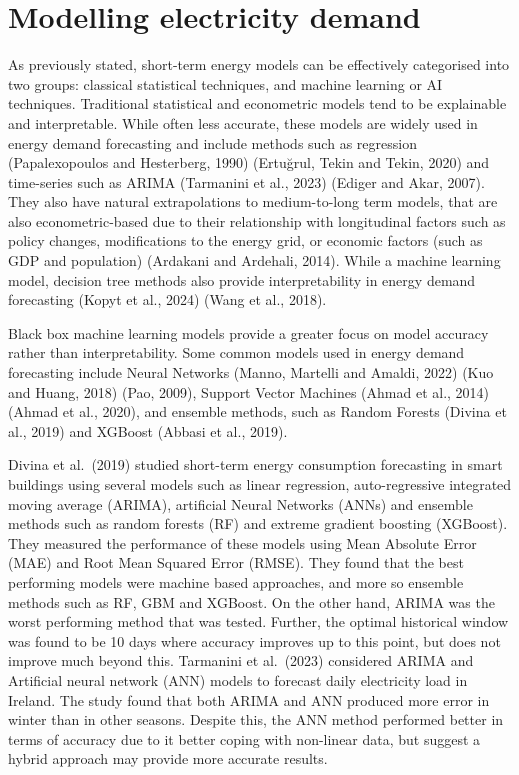 \documentclass[mstat,12pt]{unswthesis}
\begin{document}
\section{Modelling electricity demand}\label{modelling-electricity-demand}

As previously stated, short-term energy models can be effectively categorised into two groups: classical statistical techniques, and machine learning or AI techniques. Traditional statistical and econometric models tend to be explainable and interpretable. While often less accurate, these models are widely used in energy demand forecasting and include methods such as regression (Papalexopoulos and Hesterberg, 1990) (Ertuğrul, Tekin and Tekin, 2020) and time-series such as ARIMA (Tarmanini et al., 2023) (Ediger and Akar, 2007). They also have natural extrapolations to medium-to-long term models, that are also econometric-based due to their relationship with longitudinal factors such as policy changes, modifications to the energy grid, or economic factors (such as GDP and population) (Ardakani and Ardehali, 2014). While a machine learning model, decision tree methods also provide interpretability in energy demand forecasting (Kopyt et al., 2024) (Wang et al., 2018).

\bigskip

Black box machine learning models provide a greater focus on model accuracy rather than interpretability. Some common models used in energy demand forecasting include Neural Networks (Manno, Martelli and Amaldi, 2022) (Kuo and Huang, 2018) (Pao, 2009), Support Vector Machines (Ahmad et al., 2014) (Ahmad et al., 2020), and ensemble methods, such as Random Forests (Divina et al., 2019) and XGBoost (Abbasi et al., 2019).

\bigskip

Divina et al.~(2019) studied short-term energy consumption forecasting in smart buildings using several models such as linear regression, auto-regressive integrated moving average (ARIMA), artificial Neural Networks (ANNs) and ensemble methods such as random forests (RF) and extreme gradient boosting (XGBoost). They measured the performance of these models using Mean Absolute Error (MAE) and Root Mean Squared Error (RMSE). They found that the best performing models were machine based approaches, and more so ensemble methods such as RF, GBM and XGBoost. On the other hand, ARIMA was the worst performing method that was tested. Further, the optimal historical window was found to be 10 days where accuracy improves up to this point, but does not improve much beyond this. Tarmanini et al.~(2023) considered ARIMA and Artificial neural network (ANN) models to forecast daily electricity load in Ireland. The study found that both ARIMA and ANN produced more error in winter than in other seasons. Despite this, the ANN method performed better in terms of accuracy due to it better coping with non-linear data, but suggest a hybrid approach may provide more accurate results.
\end{document}

